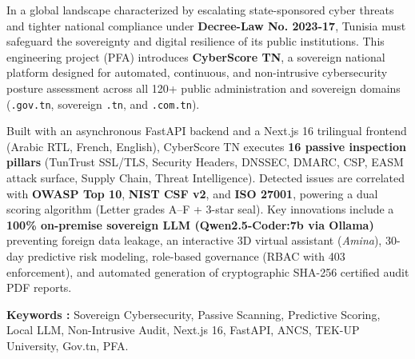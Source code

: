 In a global landscape characterized by escalating state-sponsored cyber threats and tighter national compliance under \textbf{Decree-Law No. 2023-17}, Tunisia must safeguard the sovereignty and digital resilience of its public institutions. This engineering project (PFA) introduces \textbf{CyberScore TN}, a sovereign national platform designed for automated, continuous, and non-intrusive cybersecurity posture assessment across all 120+ public administration and sovereign domains (\texttt{.gov.tn}, sovereign \texttt{.tn}, and \texttt{.com.tn}).

Built with an asynchronous FastAPI backend and a Next.js 16 trilingual frontend (Arabic RTL, French, English), CyberScore TN executes \textbf{16 passive inspection pillars} (TunTrust SSL/TLS, Security Headers, DNSSEC, DMARC, CSP, EASM attack surface, Supply Chain, Threat Intelligence). Detected issues are correlated with \textbf{OWASP Top 10}, \textbf{NIST CSF v2}, and \textbf{ISO 27001}, powering a dual scoring algorithm (Letter grades A--F + 3-star seal). Key innovations include a \textbf{100\% on-premise sovereign LLM (Qwen2.5-Coder:7b via Ollama)} preventing foreign data leakage, an interactive 3D virtual assistant (\textit{Amina}), 30-day predictive risk modeling, role-based governance (RBAC with 403 enforcement), and automated generation of cryptographic SHA-256 certified audit PDF reports.

\vspace{0.3cm}
\noindent\textbf{Keywords :} Sovereign Cybersecurity, Passive Scanning, Predictive Scoring, Local LLM, Non-Intrusive Audit, Next.js 16, FastAPI, ANCS, TEK-UP University, Gov.tn, PFA.
